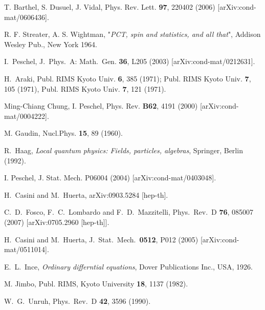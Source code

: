 \documentclass[a4paper]{article}
\begin{document}
\begin{thebibliography}{99}
 T. Barthel, S. Dusuel, J. Vidal, Phys. Rev. Lett. {\bf 97}, 220402 (2006) [arXiv:cond-mat/0606436]. 
 
 
 
 R. F. Streater, A. S. Wightman, "{\sl PCT, spin and statistics, and all that}", Addison Wesley Pub., New York 1964.


I.~Peschel, J.\ Phys.\ A: Math.\ Gen. {\bf 36}, L205 (2003) [arXiv:cond-mat/0212631]. 

 
  H.~Araki,
  Publ. RIMS  Kyoto Univ. {\bf 6}, 385 (1971); 
  Publ. RIMS Kyoto Univ. {\bf 7}, 105 (1971),
Publ. RIMS Kyoto Univ. {\bf 7}, 121 (1971). 

Ming-Chiang Chung, I. Peschel, Phys. Rev. {\bf B62}, 4191 (2000) [arXiv:cond-mat/0004222].

M. Gaudin, Nucl.Phys. {\bf 15}, 89 (1960).

  R.~Haag,
  {\sl Local quantum physics: Fields, particles, algebras}, 
 Springer, Berlin (1992). 

I. Peschel, J. Stat. Mech. P06004 (2004) [arXiv:cond-mat/0403048].

  H.~Casini and M.~Huerta,
  arXiv:0903.5284 [hep-th].


  C.~D.~Fosco, F.~C.~Lombardo and F.~D.~Mazzitelli,
  Phys.\ Rev.\  D {\bf 76}, 085007 (2007)
  [arXiv:0705.2960 [hep-th]].


  H.~Casini and M.~Huerta,
  J.\ Stat.\ Mech.\  {\bf 0512}, P012 (2005)
  [arXiv:cond-mat/0511014].

 E.~L.~Ince, {\sl Ordinary differntial equations}, Dover Publications Inc., USA, 1926.

 M. Jimbo, Publ. RIMS, Kyoto University  {\bf 18}, 1137 (1982).

  W.~G.~Unruh,
  Phys.\ Rev.\  D {\bf 42}, 3596 (1990).




\end{thebibliography}
\end{document}
